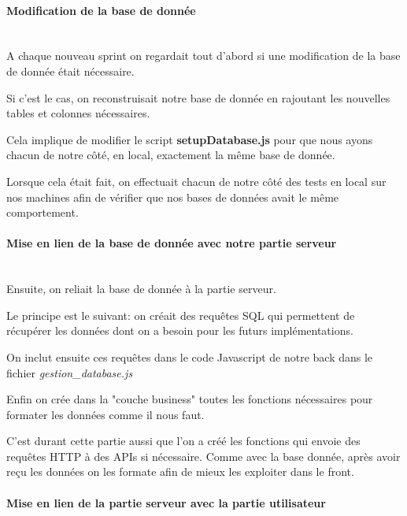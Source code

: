 \documentclass[12pt,french]{article}
\begin{document}
\paragraph{Modification de la base de donnée \\\\}

A chaque nouveau sprint on regardait tout d'abord si une modification de la base de donnée était nécessaire.

\medskip

Si c'est le cas, on reconstruisait notre base de donnée en rajoutant les nouvelles tables et colonnes nécessaires.

Cela implique de modifier le script \textbf{setupDatabase.js} pour que nous ayons chacun de notre côté, en local, exactement la même base de donnée.

Lorsque cela était fait, on effectuait chacun de notre côté des tests en local sur nos machines afin de vérifier que nos bases de données avait le même comportement.

\paragraph{Mise en lien de la base de donnée avec notre partie serveur \\\\}

Ensuite, on reliait la base de donnée à la partie serveur.

\medskip

Le principe est le suivant: on créait des requêtes SQL qui permettent de récupérer les données dont on a besoin pour les futurs implémentations.

On inclut ensuite ces requêtes dans le code Javascript de notre back dans le fichier \textit{gestion\_database.js}

Enfin on crée dans la "couche business" toutes les fonctions nécessaires pour formater les données comme il nous faut.

C'est durant cette partie aussi que l'on a créé les fonctions qui envoie des requêtes HTTP à des APIs si nécessaire. Comme avec la base donnée, après avoir reçu les données on les formate afin de mieux les exploiter dans le front. 

\paragraph{Mise en lien de la partie serveur avec la partie utilisateur\\\\}
\end{document}
